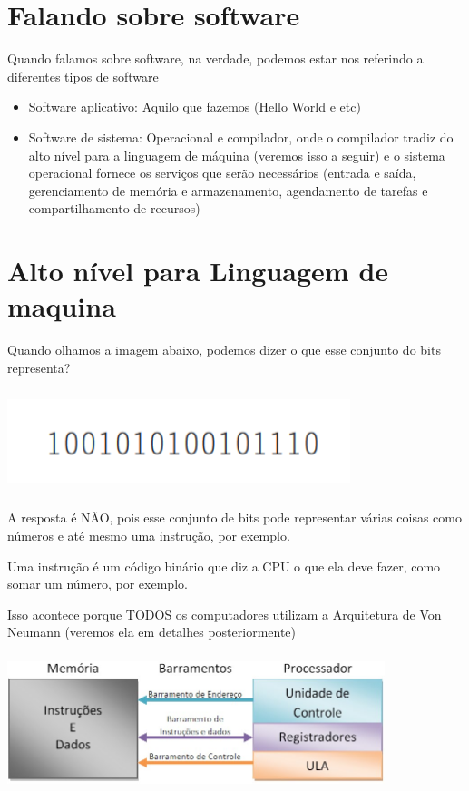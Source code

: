 \documentclass[12pt,a4paper]{report}
\begin{document}
	
	\section{Falando sobre software}
	
	Quando falamos sobre software, na verdade, podemos estar nos referindo a diferentes tipos de software
	
	\begin{itemize}
		\item Software aplicativo: Aquilo que fazemos (Hello World e etc)
		\item Software de sistema: Operacional e compilador, onde o compilador tradiz do alto nível para a linguagem de máquina (veremos isso a seguir) e o sistema operacional fornece os serviços que serão necessários (entrada e saída, gerenciamento de memória e armazenamento, agendamento de tarefas e compartilhamento de recursos)
	\end{itemize}
	
	\section{Alto nível para Linguagem de maquina}
	
	Quando olhamos a imagem abaixo, podemos dizer o que esse conjunto do bits representa?
	
	\begin{center}
		
		\includegraphics[width=10cm,height=3cm,keepaspectratio=false]{imagens-teoria/os_bits.png}
		
	\end{center}
	
	A resposta é NÃO, pois esse conjunto de bits pode representar várias coisas como números e até mesmo uma instrução, por exemplo.
	
	Uma instrução é um código binário que diz a CPU o que ela deve fazer, como somar um número, por exemplo.
	
	Isso acontece porque TODOS os computadores utilizam a Arquitetura de Von Neumann (veremos ela em detalhes posteriormente)

	\begin{center}
		
		\includegraphics[width=11cm,height=4cm,keepaspectratio=false]{imagens-teoria/von-neumann.jpeg}
		
	\end{center}
\end{document}
